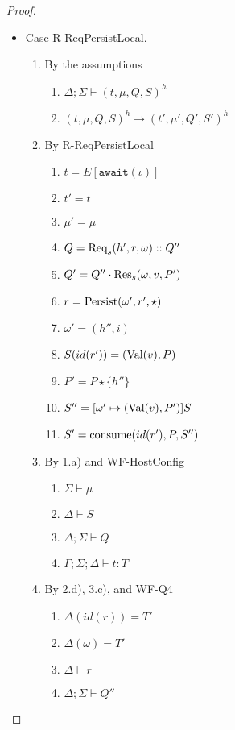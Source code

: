 \begin{proof}
\begin{itemize}
\item Case R-ReqPersistLocal.
\begin{enumerate}
\item By the assumptions
  \begin{enumerate}[label=(\alph*)]
  \item $\Delta ; \Sigma \vdash (t, \mu, Q, S)^h$
  \item $(t, \mu, Q, S)^h \longrightarrow (t', \mu', Q', S')^h$
  \end{enumerate}
\item By R-ReqPersistLocal
  \begin{enumerate}[label=(\alph*)]
  \item $t = E[\texttt{await}(\iota)]$
  \item $t' = t$
  \item $\mu' = \mu$
  \item $Q = {\textrm{Req}_s(h', r, \omega)} :: Q''$
  \item $Q' = Q'' \cdot {\textrm{Res}_s(\omega, v, P')}$
  \item $r = {\textrm{Persist}(\omega', r', \star)}$  %
  \item $\omega'    = (h'', i)$
  \item $S(id(r'))  = (\textrm{Val}(v), P)$
  \item $P'         = P \star \{h''\}$
  \item $S''        = [\omega' \mapsto (\textrm{Val}(v), P')]S$
  \item $S'         = {\textrm{consume}(id(r'), P, S'')}$
  \end{enumerate}
\item By 1.a) and WF-HostConfig
  \begin{enumerate}[label=(\alph*)]
  \item $\Sigma \vdash \mu$
  \item $\Delta \vdash S$
  \item $\Delta ; \Sigma \vdash Q$
  \item $\Gamma ; \Sigma ; \Delta \vdash t : T$
  \end{enumerate}
\item By 2.d), 3.c), and WF-Q4
  \begin{enumerate}[label=(\alph*)]
  \item $\Delta(id(r)) = T'$
  \item $\Delta(\omega) = T'$
  \item $\Delta \vdash r$
  \item $\Delta ; \Sigma \vdash Q''$
  \end{enumerate}

\end{enumerate}
\end{itemize}
\end{proof}
